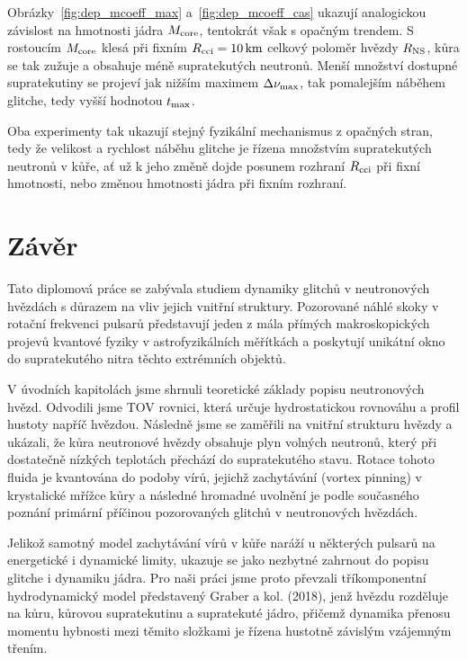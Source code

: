 \documentclass[%
final%
,htext%
]{ipothes}
\begin{document}
Obrázky~\ref{fig:dep_mcoeff_max} a~\ref{fig:dep_mcoeff_cas} ukazují analogickou závislost na hmotnosti jádra $M_{\rm core}$, tentokrát však s opačným trendem. S rostoucím $M_{\rm core}$ klesá při fixním $R_{\rm cci} = 10\,\text{km}$ celkový poloměr hvězdy $R_{\rm NS}$, kůra se tak zužuje a obsahuje méně supratekutých neutronů. Menší množství dostupné supratekutiny se projeví jak nižším maximem $\Delta\nu_{\rm max}$, tak pomalejším náběhem glitche, tedy vyšší hodnotou $t_{\rm max}$.

Oba experimenty tak ukazují stejný fyzikální mechanismus z opačných stran, tedy že velikost a rychlost náběhu glitche je řízena množstvím supratekutých neutronů v kůře, ať už k jeho změně dojde posunem rozhraní $R_{\rm cci}$ při fixní hmotnosti, nebo změnou hmotnosti jádra při fixním rozhraní.

\newpage
\noindent\chapter*{Závěr}

Tato diplomová práce se zabývala studiem dynamiky glitchů v neutronových hvězdách s důrazem na vliv jejich vnitřní struktury. Pozorované náhlé skoky v rotační frekvenci pulsarů představují jeden z mála přímých makroskopických projevů kvantové fyziky v astrofyzikálních měřítkách a poskytují unikátní okno do supratekutého nitra těchto extrémních objektů.

V úvodních kapitolách jsme shrnuli teoretické základy popisu neutronových hvězd. Odvodili jsme TOV rovnici, která určuje hydrostatickou rovnováhu a profil hustoty napříč hvězdou. Následně jsme se zaměřili na vnitřní strukturu hvězdy a ukázali, že kůra neutronové hvězdy obsahuje plyn volných neutronů, který při dostatečně nízkých teplotách přechází do supratekutého stavu. Rotace tohoto fluida je kvantována do podoby vírů, jejichž zachytávání (vortex pinning) v krystalické mřížce kůry a následné hromadné uvolnění je podle současného poznání primární příčinou pozorovaných glitchů v neutronových hvězdách.

Jelikož samotný model zachytávání vírů v kůře naráží u některých pulsarů na energetické i dynamické limity, ukazuje se jako nezbytné zahrnout do popisu glitche i dynamiku jádra. Pro naši práci jsme proto převzali tříkomponentní hydrodynamický model představený Graber a kol. (2018), jenž hvězdu rozděluje na kůru, kůrovou supratekutinu a supratekuté jádro, přičemž dynamika přenosu momentu hybnosti mezi těmito složkami je řízena hustotně závislým vzájemným třením. 
\end{document}
